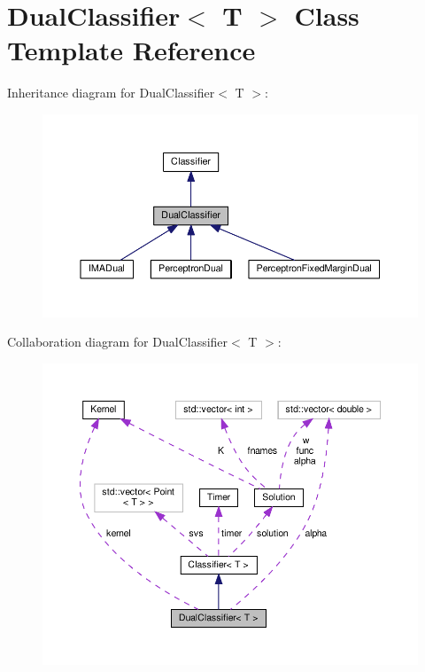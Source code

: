 \hypertarget{class_dual_classifier}{}\section{Dual\+Classifier$<$ T $>$ Class Template Reference}
\label{class_dual_classifier}


Inheritance diagram for Dual\+Classifier$<$ T $>$\+:\nopagebreak
\begin{figure}[H]
\begin{center}
\leavevmode
\includegraphics[width=350pt]{class_dual_classifier__inherit__graph}
\end{center}
\end{figure}


Collaboration diagram for Dual\+Classifier$<$ T $>$\+:
\nopagebreak
\begin{figure}[H]
\begin{center}
\leavevmode
\includegraphics[width=350pt]{class_dual_classifier__coll__graph}
\end{center}
\end{figure}
